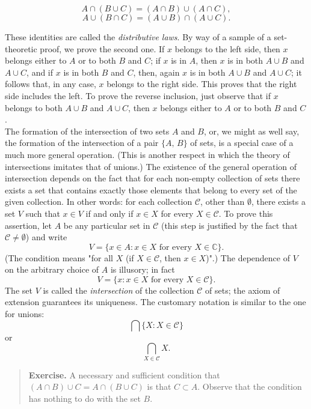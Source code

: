\[
	A \cap (B \cup C) = (A \cap B) \cup (A \cap C),
\]
\[
	A \cup (B \cap C) = (A \cup B) \cap (A \cup C).
\]

These identities are called the \textit{distributive laws}. By way of a sample of a set-theoretic proof, we prove the second one. If $x$ belongs to the left side, then $x$ belongs either to $A$ or to both $B$ and $C$; if $x$ is in $A$, then $x$ is in both $A \cup B$ and $A \cup C$, and if $x$ is in both $B$ and $C$, then, again $x$ is in both $A \cup B$ and $A \cup C$; it follows that, in any case, $x$ belongs to the right side. This proves that the right side includes the left. To prove the reverse inclusion, just observe that if $x$ belongs to both $A \cup B$ and $A \cup C$, then $x$ belongs either to $A$ or to both $B$ and $C$.\\

The formation of the intersection of two sets $A$ and $B$, or, we might as well say, the formation of the intersection of a pair $\{A, \, B\}$ of sets, is a special case of a much more general operation. (This is another respect in which the theory of intersections imitates that of unions.) The existence of the general operation of intersection depends on the fact that for each non-empty collection of sets there exists a set that contains exactly those elements that belong to every set of the given collection. In other words: for each collection $\mathcal{C}$, other than $\emptyset$, there exists a set $V$ such that $x \in V$ if and only if $x \in X$ for every $X \in \mathcal{C}$. To prove this assertion, let $A$ be any particular set in $\mathcal{C}$ (this step is justified by the fact that $\mathcal{C} \neq \emptyset$) and write
\[
	V = \{ x \in A : x \in X \text{ for every } X \in \mathbb{C}\}.
\]
(The condition means "for all $X$ (if $X \in \mathcal{C}$, then $x \in X$)".) The dependence of $V$ on the arbitrary choice of $A$ is illusory; in fact
\[
	V = \{x : x \in X \text{ for every } X \in \mathcal{C}\}.
\]
The set $V$ is called the \textit{intersection} of the collection $\mathcal{C}$ of sets; the axiom of extension guarantees its uniqueness. The customary notation is similar to the one for unions:
\[
	\bigcap \{X : X \in \mathcal{C}\}
\]
or
\[
	\bigcap_{X \in \mathcal{C}} X.
\]
\begin{quote}
	\textbf{Exercise.} A necessary and sufficient condition that $(A \cap B) \cup C = A \cap (B \cup C)$ is that $C \subset A$. Observe that the condition has nothing to do with the set $B$.
\end{quote}

